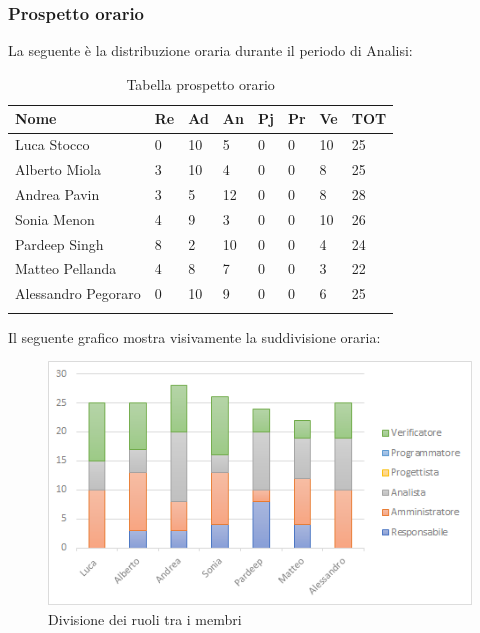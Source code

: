 \subsubsection{Prospetto orario}
La seguente è la distribuzione oraria durante il periodo di Analisi:
\begin{center}
	\renewcommand{\arraystretch}{1.5}
	\begin{longtable}[H]{ p{3.5cm}  p{1.2cm} p{1.2cm}  p{1.2cm} p{1.2cm}  p{1.2cm} p{1.2cm}  p{1.4cm}  }
		\rowcolor{tableHeadYellow}
		\textbf{Nome}   & \textbf{Re} & \textbf{Ad} & \textbf{An} & \textbf{Pj} & \textbf{Pr} & \textbf{Ve} & \textbf{TOT} \\ 
		\endhead
		Luca Stocco       & 0   & 10    & 5   & 0   & 0   & 10 	& 25 \\  
		Alberto Miola     & 3   & 10    & 4   & 0   & 0   & 8  	& 25 \\  
		Andrea Pavin      & 3  	& 5     & 12  & 0   & 0   & 8  	& 28 \\  
		Sonia Menon       & 4  	& 9     & 3   & 0   & 0   & 10  & 26 \\  
		Pardeep Singh     & 8   & 2     & 10  & 0   & 0   & 4  	& 24 \\  
		Matteo Pellanda   & 4   & 8     & 7   & 0   & 0   & 3 	& 22 \\
		Alessandro Pegoraro	& 0	& 10	& 9	  & 0	& 0	  & 6	& 25\\
		\rowcolor{white}
		\caption{Tabella prospetto orario}
	\end{longtable}
\end{center}
Il seguente grafico mostra visivamente la suddivisione oraria:
\begin{figure}[H]
	\centering
	\includegraphics[width=15cm,keepaspectratio]{../includes/pics/grafici/grafico1.png}
	\caption{\label{fig:mission}Divisione dei ruoli tra i membri}
\end{figure}
\clearpage
